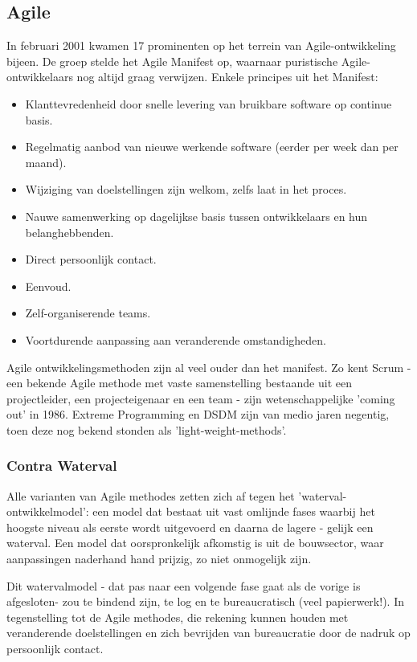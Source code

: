 \subsection{Agile}
In februari 2001 kwamen 17 prominenten op het terrein van Agile-ontwikkeling bijeen. De groep stelde het Agile Manifest \cite{Kent} op, waarnaar puristische Agile-ontwikkelaars nog altijd graag verwijzen. Enkele principes uit het Manifest: 
\begin{itemize}
	\item Klanttevredenheid door snelle levering van bruikbare software op continue basis.
	\item Regelmatig aanbod van nieuwe werkende software (eerder per week dan per maand).
	\item Wijziging van doelstellingen zijn welkom, zelfs laat in het proces.
	\item Nauwe samenwerking op dagelijkse basis tussen ontwikkelaars en hun belanghebbenden.
	\item Direct persoonlijk contact.
	\item Eenvoud.
	\item Zelf-organiserende teams.
	\item Voortdurende aanpassing aan veranderende omstandigheden.
\end{itemize}

Agile ontwikkelingsmethoden zijn al veel ouder dan het manifest. Zo kent Scrum - een bekende Agile methode met vaste samenstelling bestaande uit een projectleider, een projecteigenaar en een team - zijn wetenschappelijke 'coming out' in 1986. Extreme Programming en DSDM zijn van medio jaren negentig, toen deze nog bekend stonden als 'light-weight-methods'.

\subsubsection{Contra Waterval}
Alle varianten van Agile methodes zetten zich af tegen het 'waterval-ontwikkelmodel': een model dat bestaat uit vast omlijnde fases waarbij het hoogste niveau als eerste wordt uitgevoerd en daarna de lagere - gelijk een waterval. Een model dat oorspronkelijk afkomstig is uit de bouwsector, waar aanpassingen naderhand hand prijzig, zo niet onmogelijk zijn.

Dit watervalmodel - dat pas naar een volgende fase gaat als de vorige is afgesloten- zou te bindend zijn, te log en te bureaucratisch (veel papierwerk!). In tegenstelling tot de Agile methodes, die rekening kunnen houden met veranderende doelstellingen en zich bevrijden van bureaucratie door de nadruk op persoonlijk contact.

